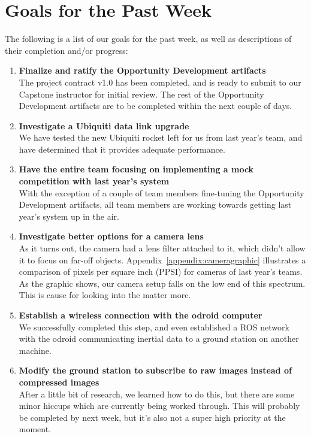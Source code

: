 \documentclass[]{../auvsi_doc}
\begin{document}
\section{Goals for the Past Week}

The following is a list of our goals for the past week, as well as descriptions of their completion and/or progress:

\begin{enumerate}
\item \textbf{Finalize and ratify the Opportunity Development artifacts}\\
The project contract v1.0 has been completed, and is ready to submit to our Capstone instructor for initial review. The rest of the Opportunity Development artifacts are to be completed within the next couple of days.
\item \textbf{Investigate a Ubiquiti data link upgrade}\\
We have tested the new Ubiquiti rocket left for us from last year's team, and have determined that it provides adequate performance.
\item \textbf{Have the entire team focusing on implementing a mock competition with last year's system}\\
With the exception of a couple of team members fine-tuning the Opportunity Development artifacts, all team members are working towards getting last year's system up in the air.
\item \textbf{Investigate better options for a camera lens}\\
As it turns out, the camera had a lens filter attached to it, which didn't allow it to focus on far-off objects. Appendix~\ref{appendix:cameragraphic} illustrates a comparison of pixels per square inch (PPSI) for cameras of last year's teams. As the graphic shows, our camera setup falls on the low end of this spectrum. This is cause for looking into the matter more.
\item \textbf{Establish a wireless connection with the odroid computer}\\
We successfully completed this step, and even established a ROS network with the odroid communicating inertial data to a ground station on another machine.
\item \textbf{Modify the ground station to subscribe to raw images instead of compressed images}\\
After a little bit of research, we learned how to do this, but there are some minor hiccups which are currently being worked through. This will probably be completed by next week, but it's also not a super high priority at the moment.
\end{enumerate}
\end{document}
